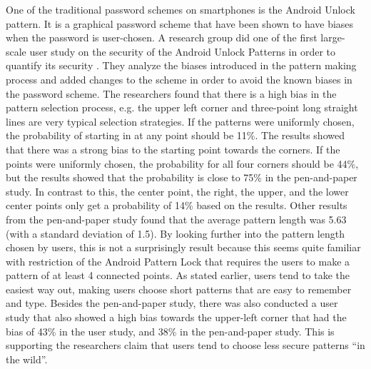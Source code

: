   One of the traditional password schemes on smartphones is the Android Unlock pattern. It is a graphical password scheme that have been shown to have biases when the password is user-chosen. A research group did one of the first large-scale user study on the security of the Android Unlock Patterns in order to quantify its security \cite{Uellenbeck}. They analyze the biases introduced in the pattern making process and added changes to the scheme in order to avoid the known biases in the password scheme. The researchers found that there is a high bias in the pattern selection process, e.g. the upper left corner and three-point long straight lines are very typical selection strategies. If the patterns were uniformly chosen, the probability of starting in at any point should be 11\%. The results showed that there was a strong bias to the starting point towards the corners. If the points were uniformly chosen, the probability for all four corners should be 44\%, but the results showed that the probability is close to 75\% in the pen-and-paper study. In contrast to this, the center point, the right, the upper, and the lower center points only get a probability of 14\% based on the results. Other results from the pen-and-paper study found that the average pattern length was 5.63 (with a standard deviation of 1.5). By looking further into the pattern length chosen by users, this is not a surprisingly result because this seems quite familiar with restriction of the Android Pattern Lock that requires the users to make a pattern of at least 4 connected points. As stated earlier, users tend to take the easiest way out, making users choose short patterns that are easy to remember and type. Besides the pen-and-paper study, there was also conducted a user study that also showed a high bias towards the upper-left corner that had the bias of 43\% in the user study, and 38\% in the pen-and-paper study. This is supporting the researchers claim that users tend to choose less secure patterns ``in the wild''.

  \clearpage

